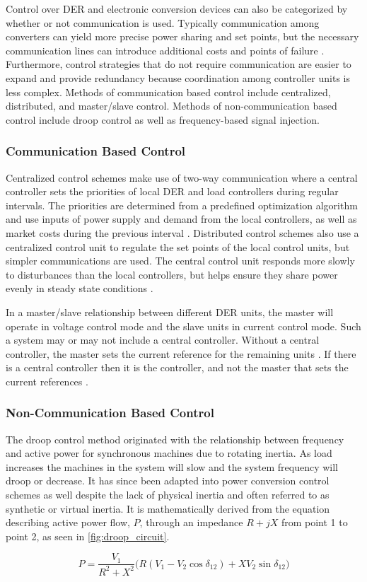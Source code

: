 Control over DER and electronic conversion devices can also be categorized by whether or not communication is used. Typically communication among converters can yield more precise power sharing and set points, but the necessary communication lines can introduce additional costs and points of failure \cite{Vandoorn2013}. Furthermore, control strategies that do not require communication are easier to expand and provide redundancy because coordination among controller units is less complex. Methods of communication based control include centralized, distributed, and master\slash slave control. Methods of non-communication based control include droop control as well as frequency-based signal injection.

\subsubsection{Communication Based Control}
Centralized control schemes make use of two-way communication where a central controller sets the priorities of local DER and load controllers during regular intervals. The priorities are determined from a predefined optimization algorithm and use inputs of power supply and demand from the local controllers, as well as market costs during the previous interval \cite{Katiraei2008}. Distributed control schemes also use a centralized control unit to regulate the set points of the local control units, but simpler communications are used. The central control unit responds more slowly to disturbances than the local controllers, but helps ensure they share power evenly in steady state conditions \cite{Prodanovic2006}. 

In a master\slash slave relationship between different DER units, the master will operate in voltage control mode and the slave units in current control mode. Such a system may or may not include a central controller. Without a central controller, the master sets the current reference for the remaining units \cite{Siri1992}. If there is a central controller then it is the controller, and not the master that sets the current references \cite{Chen1995}.

\subsubsection{Non-Communication Based Control}
\label{sec:droop}
The droop control method originated with the relationship between frequency and active power for synchronous machines due to rotating inertia. As load increases the machines in the system will slow and the system frequency will droop or decrease. It has since been adapted into power conversion control schemes as well despite the lack of physical inertia and often referred to as synthetic or virtual inertia. It is mathematically derived from the equation describing active power flow, $P$, through an impedance $ R + jX $ from point 1 to point 2, as seen in \autoref{fig:droop_circuit}.

\begin{equation}
P = \frac{V_{1}}{R^2 + X^2} \big( R \left( V_{1}-V_{2}\cos{\delta_{12}} \right) +X V_{2} \sin{\delta_{12}} \big)
\end{equation}

